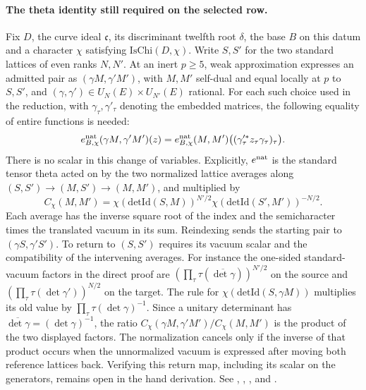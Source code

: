 \paragraph{The theta identity still required on the selected row.}\label{r9:z43-open}
Fix $D$, the curve ideal $\mathfrak c$, its discriminant twelfth root
$\delta$, the base $B$ on this datum and a character $\chi$ satisfying
$\mathrm{IsChi}(D,\chi)$. Write $S,S'$ for the two standard lattices
of even ranks $N,N'$. At an inert $p\ge5$, weak approximation expresses
an admitted pair as $(\gamma M,\gamma'M')$, with $M,M'$ self-dual and
equal locally at $p$ to $S,S'$, and $(\gamma,\gamma')\in
U_N(E)\times U_{N'}(E)$ rational. For each such choice used in the
reduction, with $\gamma_\tau,\gamma'_\tau$ denoting the embedded
matrices, the following equality of entire functions is needed:
\[
 e^{\rm nat}_{B,\chi}(\gamma M,\gamma'M')(z)=
 e^{\rm nat}_{B,\chi}(M,M')
       \bigl((\gamma_\tau^{\prime *}z_\tau\gamma_\tau)_\tau\bigr).
\]
There is no scalar in this change of variables. Explicitly, $e^{\rm nat}$
is the standard tensor theta acted on by the two normalized lattice
averages along $(S,S')\to(M,S')\to(M,M')$, and multiplied by
\[
 C_\chi(M,M')=
 \chi(\mathrm{detId}(S,M))^{N'/2}
 \chi(\mathrm{detId}(S',M'))^{-N/2}.
\]
Each average has the inverse square root of the index and the
semicharacter times the translated vacuum in its sum. Reindexing sends
the starting pair to $(\gamma S,\gamma'S')$. To return to $(S,S')$
requires its vacuum scalar and the compatibility of the intervening
averages. For instance the one-sided standard-vacuum factors in the
direct proof are
$(\prod_\tau\tau(\overline{\det\gamma}))^{N'/2}$ on the source
and $(\prod_\tau\tau(\det\gamma'))^{N/2}$ on the target. The rule
for $\chi(\mathrm{detId}(S,\gamma M))$ multiplies its old value by
$\prod_\tau\tau(\det\gamma)^{-1}$. Since a unitary determinant has
$\overline{\det\gamma}=(\det\gamma)^{-1}$, the ratio
$C_\chi(\gamma M,\gamma'M')/C_\chi(M,M')$ is the product of the two displayed factors.
The normalization cancels only if the inverse of that product occurs when the
unnormalized vacuum is expressed after moving both reference lattices back.
Verifying this return map, including its scalar on the generators, remains open
in the hand derivation.
See ,
,
,
 and
.


